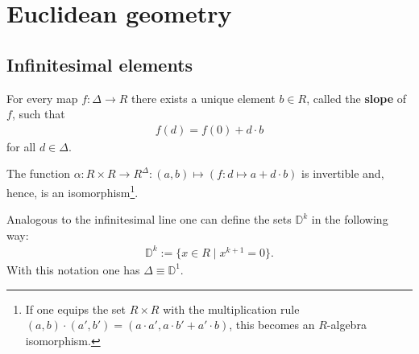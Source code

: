 \section{Euclidean geometry}
\subsection{Infinitesimal elements}


    \begin{axiom}\label{synth:kock_lawvere_axiom}
        For every map $f:\Delta\rightarrow R$ there exists a unique element $b\in R$, called the \textbf{slope} of $f$, such that
        \begin{gather}
            f(d) = f(0) + d\cdot b
        \end{gather}
        for all $d\in\Delta$.
    \end{axiom}
    \begin{result}
        The function $\alpha:R\times R\rightarrow  R^\Delta:(a,b)\mapsto(f:d\mapsto a+d\cdot b)$ is invertible and, hence, is an isomorphism\footnote{If one equips the set $R\times R$ with the multiplication rule $(a,b)\cdot(a',b') = (a\cdot a',a\cdot b' + a'\cdot b)$, this becomes an $R$-algebra isomorphism.}.
    \end{result}

    \begin{notation}
        Analogous to the infinitesimal line one can define the sets $\mathbb{D}^k$ in the following way:
        \begin{gather}
            \mathbb{D}^k := \{x\in R\mid x^{k+1} = 0\}.
        \end{gather}
        With this notation one has $\Delta\equiv\mathbb{D}^1$.
    \end{notation}

